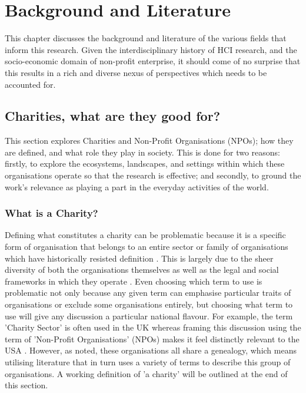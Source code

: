 \chapter{Background and Literature}
\label{sec:related}

This chapter discusses the background and literature of the various fields that inform this research. Given the interdisciplinary history of HCI research, and the socio-economic domain of non-profit enterprise, it should come of no surprise that this results in a rich and diverse nexus of perspectives which needs to be accounted for.

\section{Charities, what are they good for?}
This section explores Charities and Non-Profit Organisations (NPOs); how they are defined, and what role they play in society. This is done for two reasons: firstly, to explore the ecosystems, landscapes, and settings within which these organisations operate so that the research is effective; and secondly, to ground the work's relevance as playing a part in the everyday activities of the world.

\subsection{What is a Charity?}

Defining what constitutes a charity can be problematic because it is a specific form of organisation that belongs to an entire sector or family of organisations which have historically resisted definition \cite{salamon_search_1992-1, morris_defining_2000}. This is largely due to the sheer diversity of both the organisations themselves as well as the legal and social frameworks in which they operate \cite{salamon_search_1992-1}. Even choosing which term to use is problematic not only because any given term can emphasise particular traits of organisations or exclude some organisations entirely, but choosing what term to use will give any discussion a particular national flavour. For example, the term 'Charity Sector' is often used in the UK whereas framing this discussion using the term of 'Non-Profit Organisations' (NPOs) makes it feel distinctly relevant to the USA \cite{frumkin_being_2009}. However, as noted, these organisations all share a genealogy, which means utilising literature that in turn uses a variety of terms to describe this group of organisations. A working definition of 'a charity' will be outlined at the end of this section.

